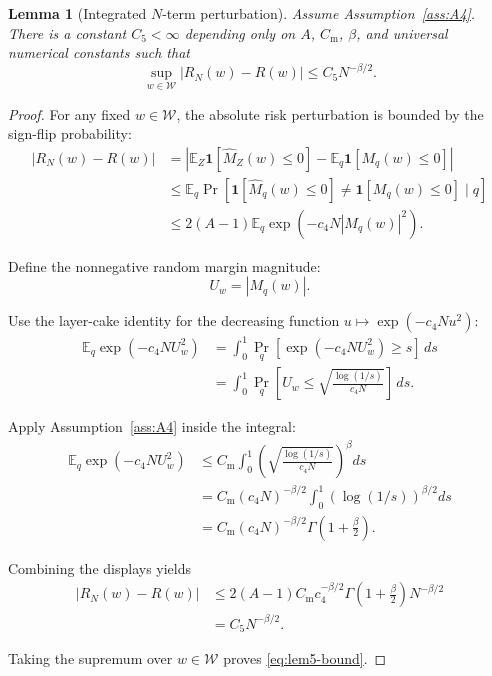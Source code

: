 \documentclass{article} %
\newtheorem{lemma}[theorem]{Lemma}
\providecommand{\Risk}{R}
\providecommand{\Mhat}{\widehat{M}}
\begin{document}
\begin{lemma}[Integrated \(N\)-term perturbation]
\label{lem:5}
Assume Assumption~\ref{ass:A4}.  There is a constant \(C_5<\infty\) depending
only on \(A\), \(C_{\mathrm m}\), \(\beta\), and universal numerical constants
such that
\begin{equation}
\label{eq:lem5-bound}
\sup_{w\in\mathcal W}
|\Risk_N(w)-\Risk(w)|
\le
C_5 N^{-\beta/2}.
\end{equation}
\end{lemma}

\begin{proof}
For any fixed \(w\in\mathcal W\), the absolute risk perturbation is bounded by
the sign-flip probability:
\begin{align}
|\Risk_N(w)-\Risk(w)|
&=
\left|
\mathbb E_Z\mathbf 1[\Mhat_Z(w)\le 0]
-
\mathbb E_q\mathbf 1[M_q(w)\le 0]
\right|
\label{eq:lem5-proof-a}
\\
&\le
\mathbb E_q
\Pr\!\left[
\mathbf 1[\Mhat_q(w)\le 0]\ne \mathbf 1[M_q(w)\le 0]
\mid q
\right]
\label{eq:lem5-proof-b}
\\
&\le
2(A-1)
\mathbb E_q
\exp\!\left(-c_4N|M_q(w)|^2\right).
\label{eq:lem5-proof-c}
\end{align}

Define the nonnegative random margin magnitude:
\begin{equation}
\label{eq:lem5-proof-U}
U_w
=
|M_q(w)|.
\end{equation}

Use the layer-cake identity for the decreasing function
\(u\mapsto \exp(-c_4Nu^2)\):
\begin{align}
\mathbb E_q \exp(-c_4N U_w^2)
&=
\int_{0}^{1}
\Pr_q\!\left[
\exp(-c_4N U_w^2)\ge s
\right]\,ds
\label{eq:lem5-proof-d}
\\
&=
\int_{0}^{1}
\Pr_q\!\left[
U_w
\le
\sqrt{\frac{\log(1/s)}{c_4N}}
\right]\,ds .
\label{eq:lem5-proof-e}
\end{align}

Apply Assumption~\ref{ass:A4} inside the integral:
\begin{align}
\mathbb E_q \exp(-c_4N U_w^2)
&\le
C_{\mathrm m}
\int_{0}^{1}
\left(
\sqrt{\frac{\log(1/s)}{c_4N}}
\right)^\beta ds
\label{eq:lem5-proof-f}
\\
&=
C_{\mathrm m}(c_4N)^{-\beta/2}
\int_{0}^{1}
\left(\log(1/s)\right)^{\beta/2}ds
\label{eq:lem5-proof-g}
\\
&=
C_{\mathrm m}(c_4N)^{-\beta/2}
\Gamma\!\left(1+\frac{\beta}{2}\right).
\label{eq:lem5-proof-h}
\end{align}

Combining the displays yields
\begin{align}
|\Risk_N(w)-\Risk(w)|
&\le
2(A-1)
C_{\mathrm m}c_4^{-\beta/2}
\Gamma\!\left(1+\frac{\beta}{2}\right)
N^{-\beta/2}
\label{eq:lem5-proof-i}
\\
&=
C_5 N^{-\beta/2}.
\label{eq:lem5-proof-j}
\end{align}

Taking the supremum over \(w\in\mathcal W\) proves \eqref{eq:lem5-bound}.
\end{proof}
\end{document}
